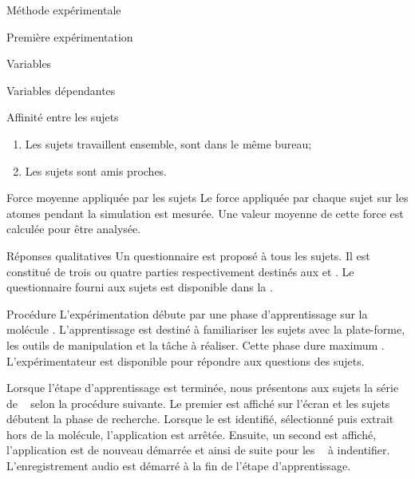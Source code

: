 \documentclass[myfrancais,ngerman,english,frenchb]{mythesis}
\begin{document}
\begin{mychapter}{Méthode expérimentale}
\begin{mysection}{Première expérimentation}
\begin{mysubsection}{Variables}
\begin{mysubsubsection}{Variables dépendantes}
\begin{myparagraph}{ Affinité entre les sujets}
\begin{enumerate}
							\item Les sujets travaillent ensemble, sont dans le même bureau;
							\item Les sujets sont amis proches.
						\end{enumerate}
					\end{myparagraph}
					\begin{myparagraph}{ Force moyenne appliquée par les sujets}
						Le force appliquée par chaque sujet sur les atomes pendant la simulation est mesurée.
						Une valeur moyenne de cette force est calculée pour être analysée.
					\end{myparagraph}
					\begin{myparagraph}{ Réponses qualitatives}
						Un questionnaire est proposé à tous les sujets.
						Il est constitué de trois ou quatre parties respectivement destinés aux  et .
						Le questionnaire fourni aux sujets est disponible dans la .
					\end{myparagraph}
				\end{mysubsubsection}
			\end{mysubsection}
			\begin{mysubsection}{Procédure}
				L'expérimentation débute par une phase d'apprentissage sur la molécule \myTRPZIPPER.
				L'apprentissage est destiné à familiariser les sujets avec la plate-forme, les outils de manipulation et la tâche à réaliser.
				Cette phase dure maximum .
				L'expérimentateur est disponible pour répondre aux questions des sujets.

				Lorsque l'étape d'apprentissage est terminée, nous présentons aux sujets la série de ~ selon la procédure suivante.
				Le premier  est affiché sur l'écran \myLCD et les sujets débutent la phase de recherche.
				Lorsque le  est identifié, sélectionné puis extrait hors de la molécule, l'application est arrêtée.
				Ensuite, un second  est affiché, l'application est de nouveau démarrée et ainsi de suite pour les ~ à indentifier.
				L'enregistrement audio est démarré à la fin de l'étape d'apprentissage.


\end{mysubsection}
\end{mysection}
\end{mychapter}
\end{document}
